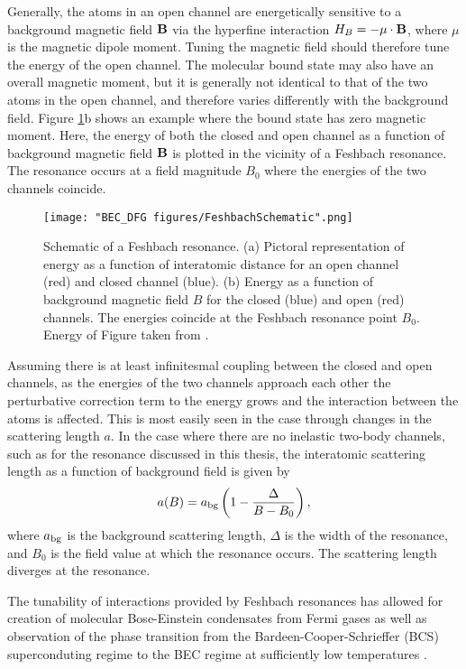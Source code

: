 Generally, the atoms in an open channel are energetically sensitive to a background magnetic field ${\bf B}$ via the hyperfine interaction $H_B=-\mu\cdot {\bf B}$, where $\mu$ is the magnetic dipole moment. Tuning the magnetic field should therefore tune the energy of the open channel. The molecular bound state may also have an overall magnetic moment, but it is generally not identical to that of the two atoms in the open channel, and therefore varies differently with the background field. Figure \ref{fig:FeshbachSchematic}b shows an example where the bound state has zero magnetic moment. Here, the energy of both the closed and open channel as a function of background magnetic field ${\bf B}$ is plotted in the vicinity of a Feshbach resonance. The resonance occurs at a field magnitude $B_0$ where the energies of the two channels coincide.

\begin{figure}
	\texttt{[image: "BEC\_DFG figures/FeshbachSchematic".png]}
\caption[Schematic of a Feshbach resonance]{Schematic of a Feshbach resonance. (a) Pictoral representation of energy as a function of interatomic distance for an open channel (red) and closed channel (blue). (b) Energy as a function of background magnetic field $B$ for the closed (blue) and open (red) channels. The energies coincide at the Feshbach resonance point $B_0$. Energy of Figure taken from \cite{KetterleDFG}.}
\label{fig:FeshbachSchematic}
\end{figure}

Assuming there is at least infinitesmal coupling between the closed and open channels, as the energies of the two channels approach each other the perturbative correction term to the energy grows and the interaction between the atoms is affected. This is most easily seen in the \swave{} case through changes in the scattering length $a$. In the case where there are no inelastic two-body channels, such as for the \K{} resonance discussed in this thesis, the interatomic scattering length as a function of background field is given by\cite{Chin10}
\begin{equation}
a(B)=a_{\rm{bg}}\left(1-\frac{\Delta}{B-B_0}\right),
\label{eqn:feshbach}
\end{equation}
where $a_{\rm{bg}}$ is the background scattering length, $\Delta$ is the width of the resonance, and $B_0$ is the field value at which the resonance occurs. The scattering length diverges at the resonance.

The tunability of interactions provided by Feshbach resonances has allowed for creation of molecular Bose-Einstein condensates from Fermi gases \cite{Greiner03,Zwierlein03, Jochim03} as well as observation of the phase transition from the Bardeen-Cooper-Schrieffer (BCS) superconduting regime to the BEC regime at sufficiently low temperatures \cite{Bartenstein04, Bourdel04, Zwierlein04, Regal04}.

